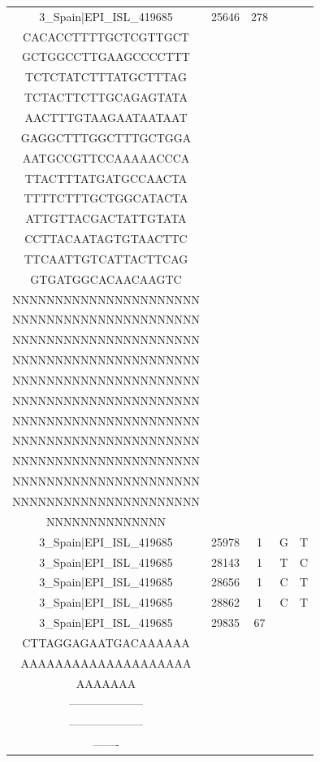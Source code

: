 \documentclass[a4paper,10pt]{article}
\begin{document}
\begin{longtable}{@{}ccccc@{}}
3\_Spain|EPI\_ISL\_419685 & 25646 & 278 & \begin{tabular}[c]{@{}c@{}}GTTGTTTGTAACAGTTTACT\\ CACACCTTTTGCTCGTTGCT\\ GCTGGCCTTGAAGCCCCTTT\\ TCTCTATCTTTATGCTTTAG\\ TCTACTTCTTGCAGAGTATA\\ AACTTTGTAAGAATAATAAT\\ GAGGCTTTGGCTTTGCTGGA\\ AATGCCGTTCCAAAAACCCA\\ TTACTTTATGATGCCAACTA\\ TTTTCTTTGCTGGCATACTA\\ ATTGTTACGACTATTGTATA\\ CCTTACAATAGTGTAACTTC\\ TTCAATTGTCATTACTTCAG\\ GTGATGGCACAACAAGTC\end{tabular} & \begin{tabular}[c]{@{}c@{}}NNNNNNNNNNNNNNNNNNNNNN\\ NNNNNNNNNNNNNNNNNNNNNN\\ NNNNNNNNNNNNNNNNNNNNNN\\ NNNNNNNNNNNNNNNNNNNNNN\\ NNNNNNNNNNNNNNNNNNNNNN\\ NNNNNNNNNNNNNNNNNNNNNN\\ NNNNNNNNNNNNNNNNNNNNNN\\ NNNNNNNNNNNNNNNNNNNNNN\\ NNNNNNNNNNNNNNNNNNNNNN\\ NNNNNNNNNNNNNNNNNNNNNN\\ NNNNNNNNNNNNNNNNNNNNNN\\ NNNNNNNNNNNNNNNNNNNNNN\\ NNNNNNNNNNNNNN\end{tabular} \\* \midrule
3\_Spain|EPI\_ISL\_419685 & 25978 & 1 & G & T \\* \midrule
3\_Spain|EPI\_ISL\_419685 & 28143 & 1 & T & C \\* \midrule
3\_Spain|EPI\_ISL\_419685 & 28656 & 1 & C & T \\* \midrule
3\_Spain|EPI\_ISL\_419685 & 28862 & 1 & C & T \\* \midrule
3\_Spain|EPI\_ISL\_419685 & 29835 & 67 & \begin{tabular}[c]{@{}c@{}}CCATGTGATTTTAATAGCTT\\ CTTAGGAGAATGACAAAAAA\\ AAAAAAAAAAAAAAAAAAAA\\ AAAAAAA\end{tabular} & \begin{tabular}[c]{@{}c@{}}--------------------\\ --------------------\\ --------------------\\ -------\end{tabular} \\* \midrule

\end{longtable}
\end{document}
